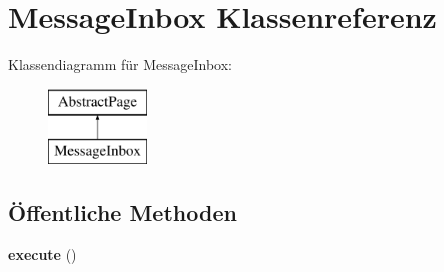 \hypertarget{class_message_inbox}{}\section{Message\+Inbox Klassenreferenz}
\label{class_message_inbox}
Klassendiagramm für Message\+Inbox\+:\begin{figure}[H]
\begin{center}
\leavevmode
\includegraphics[height=2.000000cm]{class_message_inbox}
\end{center}
\end{figure}
\subsection*{Öffentliche Methoden}
\begin{DoxyCompactItemize}
\item 
\mbox{\label{class_message_inbox_a6757cc4c9df7f44248ea32ff51ea5982}} 
{\bfseries execute} ()
\end{DoxyCompactItemize}
